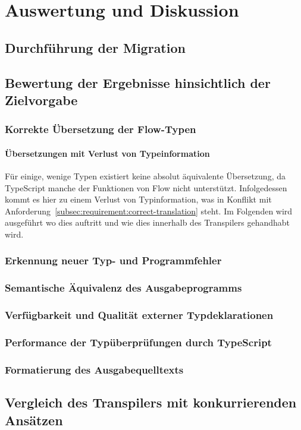 \chapter{Auswertung und Diskussion}
\label{chap:evaluation}

\section{Durchführung der Migration}



\section{Bewertung der Ergebnisse hinsichtlich der Zielvorgabe}

\subsection{Korrekte Übersetzung der Flow-Typen}

\subsubsection{Übersetzungen mit Verlust von Typeinformation}

Für einige, wenige Typen existiert keine absolut äquivalente Übersetzung, da TypeScript manche der Funktionen von Flow nicht unterstützt. Infolgedessen kommt es hier zu einem Verlust von Typinformation, was in Konflikt mit Anforderung~\ref{subsec:requirement:correct-translation} steht. Im Folgenden wird ausgeführt wo dies auftritt und wie dies innerhalb des Transpilers gehandhabt wird.

\subsection{Erkennung neuer Typ- und Programmfehler}

\subsection{Semantische Äquivalenz des Ausgabeprogramms}

\subsection{Verfügbarkeit und Qualität externer Typdeklarationen}

\subsection{Performance der Typüberprüfungen durch TypeScript}

\subsection{Formatierung des Ausgabequelltexts}

\section{Vergleich des Transpilers mit konkurrierenden Ansätzen}
\label{evaluation:other-tools}

